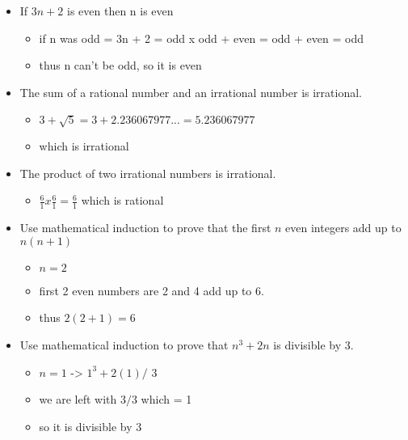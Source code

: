 \documentclass{article}
\begin{document}
\begin{itemize} 
\item If $3n + 2$ is even then n is even
    \begin{itemize}
    \item if n was odd = 3n + 2 = odd x odd + even = odd + even = odd
    \item thus n can't be odd, so it is even
\end{itemize}
\end{itemize}

\begin{itemize}
    \item The sum of a rational number and an irrational number is irrational. 
    \begin{itemize}
        \item $3 + \sqrt{5} = 3 + 2.236067977... = 5.236067977$
        \item which is irrational
    \end{itemize}
\end{itemize}

\begin{itemize}
    \item The product of two irrational numbers is irrational.
    \begin{itemize}
        \item $\frac{6}{1} x \frac{6}{1} = \frac{6}{1}$ which is rational
    \end{itemize}
\end{itemize}

\begin{itemize}

 \item Use mathematical induction to prove that the first $n$ even integers add up to $n(n+ 1)$
    \begin{itemize}
        \item $n=2$
        \item first 2 even numbers are 2 and 4 add up to 6.
        \item thus $2(2+1) =6$
    \end{itemize}
\end{itemize}

\begin{itemize}
\item Use mathematical induction to prove that $n^3 + 2n $ is divisible by 3.
    \begin{itemize}
        \item $n=1$ -> $ {1^3+2(1)} / $ 3
        \item we are left with $ 3 / 3$ which = 1
        \item so it is divisible by 3
    \end{itemize}
\end{itemize} 
\end{document}
